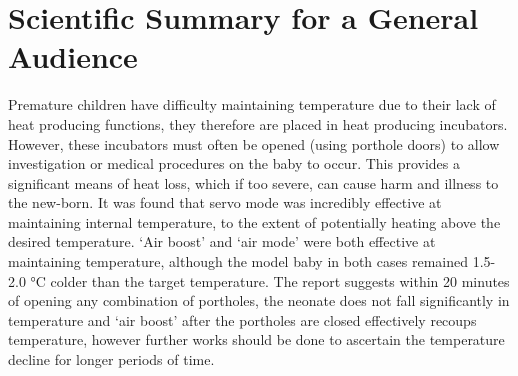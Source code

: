 \documentclass{article}
\begin{document}
\section{Scientific Summary for a General Audience}
Premature children have difficulty maintaining temperature due to their lack of heat producing functions, they therefore are placed in heat producing incubators. However, these incubators must often be opened (using porthole doors) to allow investigation or medical procedures on the baby to occur. This provides a significant means of heat loss, which if too severe, can cause harm and illness to the new-born. It was found  that servo mode was incredibly effective at maintaining internal temperature, to the extent of potentially heating above the desired temperature. ‘Air boost’ and ‘air mode’ were both effective at maintaining temperature, although the model baby in both cases remained 1.5-2.0 °C colder than the target temperature. The report suggests within 20 minutes of opening any combination of portholes, the neonate does not fall significantly in temperature and ‘air boost’ after the portholes are closed effectively recoups temperature, however further works should be done to ascertain the temperature decline for longer periods of time. 
\end{document}
